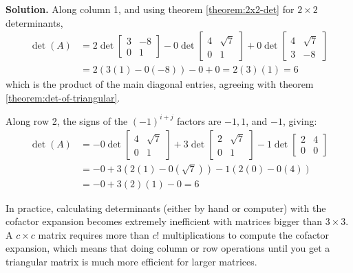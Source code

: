 \documentclass[11pt, letterpaper]{report}
\newenvironment{book}{}{}
\newcounter{theorem}[chapter]
\begin{document}
\begin{book}
\textbf{Solution.} Along column 1, and using theorem \ref{theorem:2x2-det} for $2\times 2$ determinants,
\begin{align*}
\det(A) &= 2\det \begin{bmatrix}
3 & -8 \\
0 & 1
\end{bmatrix} - 0\det \begin{bmatrix}
4 & \sqrt{7} \\
0 & 1
\end{bmatrix}
+0 \det \begin{bmatrix}
4 & \sqrt{7} \\
3 & -8
\end{bmatrix} \\
&= 2 ( 3(1) - 0(-8) ) -0+0 = 2(3)(1) = 6
\end{align*}
which is the product of the main diagonal entries, agreeing with theorem \ref{theorem:det-of-triangular}.

Along row 2, the signs of the $(-1)^{i+j}$ factors are $-1, 1$, and $-1$, giving:
\begin{align*}
\det(A) &= -0\det\begin{bmatrix}
4 & \sqrt{7} \\
0 & 1
\end{bmatrix} + 3\det\begin{bmatrix}
2 & \sqrt{7} \\
0 & 1
\end{bmatrix} -1\det\begin{bmatrix}
2 & 4 \\
0 & 0
\end{bmatrix} \\
&=-0 +3 ( 2(1)-0(\sqrt{7}) )-1 ( 2(0)-0(4) )\\
&=-0+ 3(2)(1) -0 = 6
\end{align*}
\blacksquare
\end{book}

In practice, calculating determinants (either by hand or computer) with the cofactor expansion becomes extremely inefficient with matrices bigger than $3\times 3$. A $c\times c$ matrix requires more than $c!$ multiplications to compute the cofactor expansion, which means that doing column or row operations until you get a triangular matrix is much more efficient for larger matrices.
\end{document}
